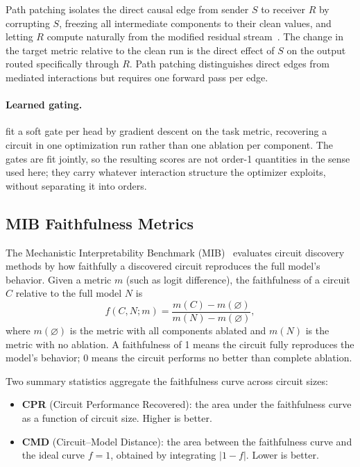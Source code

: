 \documentclass{article}
\begin{document}
Path patching isolates the direct causal edge from sender $S$ to
receiver $R$ by corrupting $S$, freezing all intermediate components to
their clean values, and letting $R$ compute naturally from the modified
residual stream~\citep{wang2022ioi}. The change in the target metric
relative to the clean run is the direct effect of $S$ on the output
routed specifically through $R$. Path patching distinguishes direct
edges from mediated interactions but requires one forward pass per edge.

\paragraph{Learned gating.}

\citet{chen2025causalheadgating} fit a soft gate per head by gradient
descent on the task metric, recovering a circuit in one optimization run
rather than one ablation per component. The gates are fit jointly, so the
resulting scores are not order-1 quantities in the sense used here; they
carry whatever interaction structure the optimizer exploits, without
separating it into orders.

\subsection{MIB Faithfulness Metrics}
\label{sec:mib-metrics}

The Mechanistic Interpretability Benchmark
(MIB)~\citep{mueller2025mib} evaluates circuit discovery methods by how
faithfully a discovered circuit reproduces the full model's behavior.
Given a metric $m$ (such as logit difference), the faithfulness of a
circuit $C$ relative to the full model $N$ is
\begin{equation}
  f(C, N; m) = \frac{m(C) - m(\varnothing)}{m(N) - m(\varnothing)},
  \label{eq:faithfulness}
\end{equation}
where $m(\varnothing)$ is the metric with all components ablated and
$m(N)$ is the metric with no ablation. A faithfulness of 1 means the
circuit fully reproduces the model's behavior; 0 means the circuit
performs no better than complete ablation.

Two summary statistics aggregate the faithfulness curve across circuit
sizes:

\begin{itemize}
\item \textbf{CPR} (Circuit Performance Recovered): the area under the
  faithfulness curve as a function of circuit size. Higher is better.

\item \textbf{CMD} (Circuit--Model Distance): the area between the
  faithfulness curve and the ideal curve $f = 1$, obtained by integrating
  $|1 - f|$. Lower is better.
\end{itemize}
\end{document}
